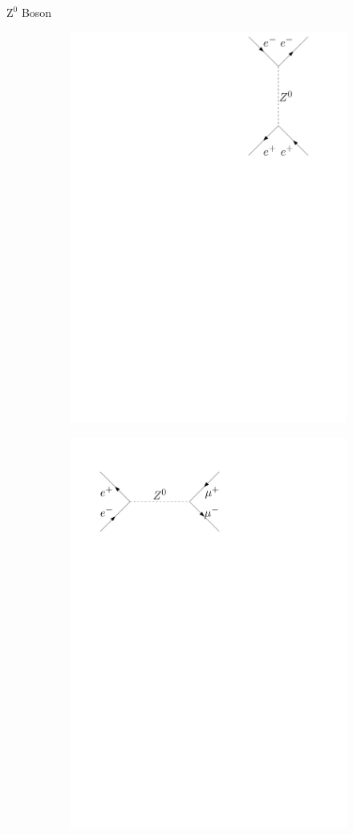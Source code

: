 \documentclass[11pt,xcolor=dvipsnames,professionalfonts]{beamer}
\begin{document}
\begin{frame}{$\mathrm{Z}^0$ Boson}
\begin{figure}[htb]
\begin{subfigure}{.28\textwidth}
			\centering
			\includegraphics[width=.8\textwidth]{./figures/theory/feynman/ee_t}
		\end{subfigure}
		\begin{subfigure}{.28\textwidth}
			\centering
			\includegraphics[width=.8\textwidth]{./figures/theory/feynman/mm}

\end{subfigure}
\end{figure}
\end{frame}
\end{document}
